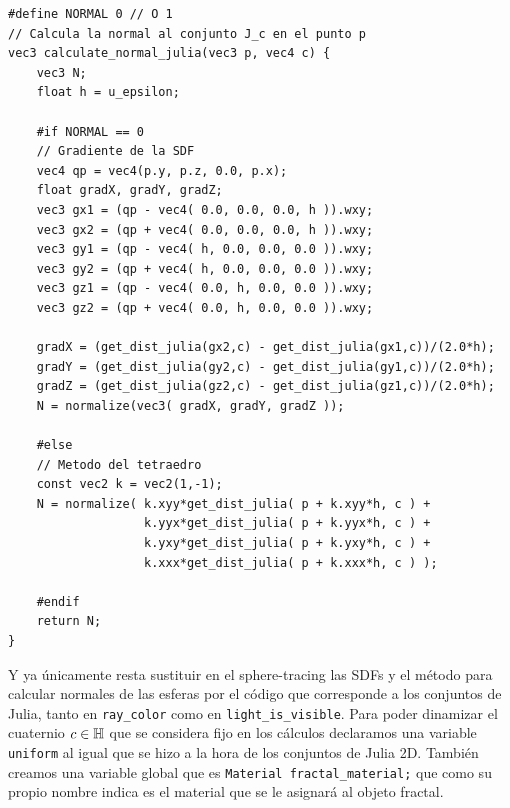 \begin{lstlisting}
#define NORMAL 0 // O 1
// Calcula la normal al conjunto J_c en el punto p
vec3 calculate_normal_julia(vec3 p, vec4 c) {
    vec3 N;
    float h = u_epsilon;

    #if NORMAL == 0
    // Gradiente de la SDF
    vec4 qp = vec4(p.y, p.z, 0.0, p.x);
    float gradX, gradY, gradZ;
    vec3 gx1 = (qp - vec4( 0.0, 0.0, 0.0, h )).wxy;
    vec3 gx2 = (qp + vec4( 0.0, 0.0, 0.0, h )).wxy;
    vec3 gy1 = (qp - vec4( h, 0.0, 0.0, 0.0 )).wxy;
    vec3 gy2 = (qp + vec4( h, 0.0, 0.0, 0.0 )).wxy;
    vec3 gz1 = (qp - vec4( 0.0, h, 0.0, 0.0 )).wxy;
    vec3 gz2 = (qp + vec4( 0.0, h, 0.0, 0.0 )).wxy;
    
    gradX = (get_dist_julia(gx2,c) - get_dist_julia(gx1,c))/(2.0*h);
    gradY = (get_dist_julia(gy2,c) - get_dist_julia(gy1,c))/(2.0*h);
    gradZ = (get_dist_julia(gz2,c) - get_dist_julia(gz1,c))/(2.0*h);
    N = normalize(vec3( gradX, gradY, gradZ ));

    #else
    // Metodo del tetraedro
    const vec2 k = vec2(1,-1);
    N = normalize( k.xyy*get_dist_julia( p + k.xyy*h, c ) + 
                   k.yyx*get_dist_julia( p + k.yyx*h, c ) + 
                   k.yxy*get_dist_julia( p + k.yxy*h, c ) + 
                   k.xxx*get_dist_julia( p + k.xxx*h, c ) );

    #endif
    return N;
}
\end{lstlisting}

Y ya únicamente resta sustituir en el sphere-tracing las SDFs y el método para calcular normales de las esferas por el código que corresponde a los conjuntos de Julia, tanto en \verb|ray_color| como en \verb|light_is_visible|. Para poder dinamizar el cuaternio $c\in\mathbb{H}$ que se considera fijo en los cálculos declaramos una variable \verb|uniform| al igual que se hizo a la hora de los conjuntos de Julia 2D. También creamos una variable global que es \verb|Material fractal_material;| que como su propio nombre indica es el material que se le asignará al objeto fractal.

